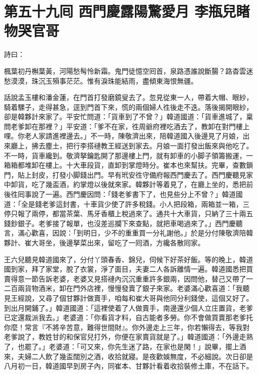 
\chapter*{第五十九囘 西門慶露陽驚愛月 李瓶兒睹物哭官哥}


詩曰：

楓葉初丹槲葉黃，河陽愁髩怜新霜。鬼門徒憶空囘首，泉路憑誰說斷腸？路杳雲迷愁漠漠，珠沉玉殞事茫茫。惟有淚珠能結雨，盡傾東海恨無疆。

話說孟玉樓和潘金蓮，在門首打發磨鏡叟去了。忽見從東一人，帶着大帽、眼紗，騎着騾子，走得甚急，逕到門首下來，慌的兩個婦人徃後走不迭。落後揭開眼紗，卻是韓夥計來家了。平安忙問道：「貨車到了不曾？」韓道國道：「貨車進城了，稟問老爹卸在那裡？」平安道：「爹不在家，徃周爺府裡吃酒去了，教卸在對門樓上哩。你老人家請進裡邊去。」不一時，陳敬濟出來，陪韓道國入後邊見了月娘，出來廳上，拂去塵土，把行李搭褳教王經送到家去。月娘一面打發出飯來與他吃了。不一時，貨車纔到。敬濟拏鑰匙開了那邊樓上門，就有卸車的小脚子領籌搬運，一箱箱都堆卸在樓上。十大車段貨，直卸到掌燈時分。崔本也來幫扶。完畢，查數鎖門，貼上封皮，打發小脚錢出門。早有玳安徃守備府報西門慶去了。西門慶聽見家中卸貨，吃了幾盃酒，約掌燈以後就來家。韓夥計等着見了，在廳上坐的，悉把前後徃囘事說了一遍。西門慶因問：「錢老爹書下了，也見些分上不曾？」韓道國道：「全是錢老爹這封書，十車貨少使了許多稅錢。小人把段箱，兩箱並一箱，三停只報了兩停，都當茶葉、馬牙香櫃上稅過來了。通共十大車貨，只納了三十兩五錢鈔銀子。老爹接了報單，也沒差巡攔下來查點，就把車喝過來了。」西門慶聽言，滿心歡喜，{}因說：「到明日，少不的重重買一分礼謝他。」於是分付陳敬濟陪韓夥計、崔大哥坐，後邊拏菜出來，留吃了一囘酒，方纔各散囘家。

王六兒聽見韓道國來了，分付丫頭春香、錦兒，伺候下好茶好飯。等的晚上，韓道國到家，拜了家堂，脫了衣裳，淨了面目，夫妻二人各訴離情一遍。韓道國悉把買賣得意一節告訴老婆，老婆又見搭褳內沉沉重重許多銀兩，因問他，替己又帶了一二百兩貨物酒米，卸在門外店裡，慢慢發賣了銀子來家。老婆滿心歡喜道：「我聽見王經說，又尋了個甘夥計做賣手，咱每和崔大哥與他同分利錢使，這個又好了。到出月開鋪了。」韓道國道：「這裡使着了人做賣手，南邊還少個人立庄置貨，老爹已定還裁派我去。」老婆道：「你看貨才料，自古能者多勞。你不會做買賣那老爹托你麼！常言『不將辛苦意，難得世間財』。你外邊走上三年，你若懶得去，等我對老爹說了，教姓甘的和保官兒打外，你便在家賣貨就是了。」韓道國道：「外邊走熟了，也罷了。」老婆道：「可又來，你先生迷了路，在家也是閑！」說畢，擺上酒來，夫婦二人飲了幾盃闊別之酒，收拾就寢。是夜歡娛無度，不必細說。次日卻是八月初一日，韓道國早到房子內，同崔本、甘夥計看着收拾裝修土庫，不在話下。

